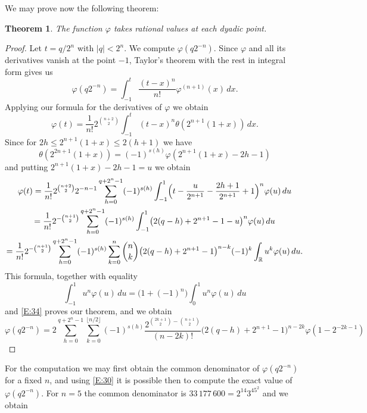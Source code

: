 \documentclass[10pt]{amsart}
\newtheorem{thm}{Theorem}
\theoremstyle{definition}
\theoremstyle{remark}
\begin{document}
We may prove now the following theorem:
\begin{thm}\label{T:7}
The function $\varphi$ takes rational values at each dyadic point.
\end{thm}
\begin{proof}
Let $t=q/2^n$ with $|q|<2^n$. We compute $\varphi(q2^{-n})$.
Since $\varphi$ and all its derivatives vanish at the point $-1$,
Taylor's theorem with the rest in integral form gives us
\[\varphi(q2^{-n})=\int_{-1}^t \frac{(t-x)^n}{n!}\varphi^{(n+1)}(x)\,dx.\]
Applying our formula for the derivatives of $\varphi$  we obtain
\[\varphi(t)=\frac{1}{n!}2^{\binom{n+2}{2}}\int_{-1}^t(t-x)^n\theta(2^{n+1}(1+x))\,dx.\]
Since for $2h\le 2^{n+1}(1+x)\le 2(h+1)$ we have \[\theta(2^{2n+1}(1+x))=(-1)^{s(h)}
\varphi(2^{n+1}(1+x)-2h-1)\] and putting $2^{n+1}(1+x)-2h-1=u$ we obtain
\begin{multline*}
\varphi(t)=\frac{1}{n!}2^{\binom{n+2}{2}}2^{-n-1}\sum_{h=0}^{q+2^n-1}(-1)^{s(h)}
\int_{-1}^1\Bigl(t-\frac{u}{2^{n+1}}-\frac{2h+1}{2^{n+1}}+1\Bigr)^n\varphi(u)\,du\\
=\frac{1}{n!}2^{-\binom{n+1}{2}}\sum_{h=0}^{q+2^n-1}(-1)^{s(h)}
\int_{-1}^1\bigl(2(q-h)+2^{n+1}-1-u\bigr)^n\varphi(u)\,du\\
=\frac{1}{n!}2^{-\binom{n+1}{2}}\sum_{h=0}^{q+2^n-1}(-1)^{s(h)}\sum_{k=0}^n
\binom{n}{k}\bigl(2(q-h)+2^{n+1}-1\bigr)^{n-k}(-1)^k\int_{\mathbb{R}}u^k\varphi(u)\,du.
\end{multline*}
This formula, together with  equality
\[\int_{-1}^1u^n\varphi(u)\,du=\bigl(1+(-1)^n\bigr)\int_0^1u^n\varphi(u)\,du\]
and \eqref{E:34} proves our theorem, and we obtain
\[\varphi(q2^{-n})=
2\sum_{h=0}^{q+2^n-1}\sum_{k=0}^{\lfloor n/2\rfloor}(-1)^{s(h)}
\frac{2^{\binom{2k+1}{2}-\binom{n+1}{2}}}{(n-2k)!}
\bigl(2(q-h)+2^{n+1}-1\bigr)^{n-2k}\varphi(1-2^{-2k-1})\]
\end{proof}

For the computation we may  first obtain the common denominator of $\varphi(q2^{-n})$
for a fixed $n$, and using \eqref{E:30} it is possible then to compute the exact
value of $\varphi(q2^{-n})$. For $n=5$ the common denominator is $33\,177\,600=
2^{14}3^45^2$ and we obtain
\end{document}
